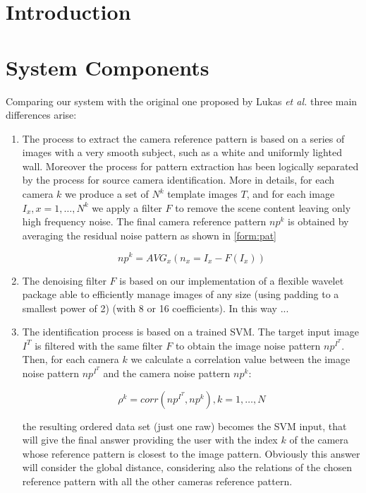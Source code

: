 \documentclass[runningheads,11pt]{llncs}
\begin{document}

\section{Introduction}

\section{System Components}

Comparing our system with the original one proposed by Lukas
\emph{et al.} \cite{Fri06} three main differences arise:

\begin{enumerate}
\item The process to extract the camera reference pattern is based
on a series of images with a very smooth subject, such as a white
and uniformly lighted wall. Moreover the process for pattern
extraction has been logically separated by the process for source
camera identification. More in details, for each camera $ k $  we
produce a set of $ N^k $ template images $ T $, and for each image $
I_x, x = 1, \ldots, N^k $ we apply a filter $ F $ to remove the
scene content leaving only high frequency noise. The final camera
reference pattern $ np^k $ is obtained by averaging the residual
noise pattern as shown in \ref{form:pat}

\begin{equation}
np^k = AVG_x(n_x = I_x - F(I_x)) \label{form:pat}
\end{equation}

\item The denoising filter $ F $ is based on our implementation of
a flexible wavelet package able to efficiently manage images of any
size (using padding to a smallest power of 2) (with 8 or 16
coefficients). In this way ...

\item The identification process is based on a trained SVM. The target
input image $ I^T$ is filtered with the same filter $ F $ to obtain
the image noise pattern $ np^{I^T} $. Then, for each camera $ k $ we
calculate a correlation value between the image noise pattern $
np^{I^T} $ and the camera noise pattern $ np^k $:

\begin{equation}
\rho^{k} = corr( np^{I^T}, np^k), k = 1, \dots, N \label{form:np}
\end{equation}

the resulting ordered data set (just one raw) becomes the SVM input,
that will give the final answer providing the user with the index $
k $ of the camera whose reference pattern is closest to the image
pattern. Obviously this answer will consider the global distance,
considering also the relations of the chosen reference pattern with
all the other cameras reference pattern.
\end{enumerate}
\end{document}
